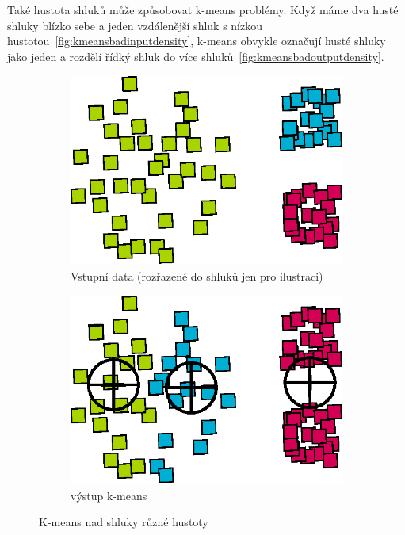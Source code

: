 Také hustota shluků může způsobovat k-means problémy. Když máme dva husté shluky blízko sebe a jeden vzdálenější shluk s nízkou hustotou~\autoref{fig:kmeansbadinputdensity}, k-means obvykle označují husté shluky jako jeden a rozdělí řídký shluk do více shluků~\autoref{fig:kmeansbadoutputdensity}.
\begin{figure}[h]
\begin{subfigure}{.49\textwidth}
  \centering
  \includegraphics[width=.5\linewidth]{img/kmeans_badInputSampleDensity.eps}
  \caption{Vstupní data (rozřazené do shluků jen pro ilustraci)}
  \label{fig:kmeansbadinputdensity}
\end{subfigure}
\begin{subfigure}{.49\textwidth}
  \centering
  \includegraphics[width=.5\linewidth]{img/kmeans_badOutputSampleDensity.eps}
  \caption{výstup k-means}
  \label{fig:kmeansbadoutputdensity}
\end{subfigure}
\caption{K-means nad shluky různé hustoty}
\end{figure}

